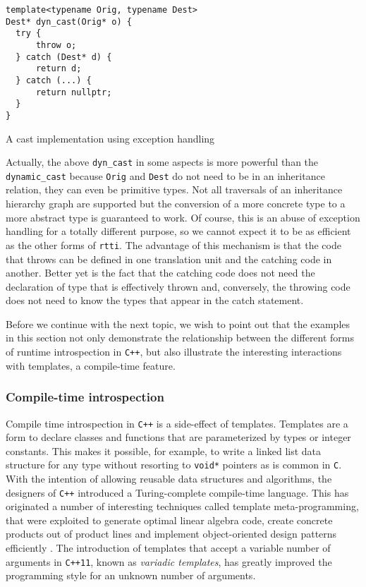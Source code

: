 \begin{listing}[H]
\begin{verbatim}
template<typename Orig, typename Dest>
Dest* dyn_cast(Orig* o) {
  try {
      throw o;
  } catch (Dest* d) {
      return d;
  } catch (...) {
      return nullptr;
  }
}
\end{verbatim}
\caption{A cast implementation using exception handling}
\label{lst:dyncast}
\end{listing}

Actually, the above \texttt{dyn\_cast} in some aspects is more powerful than the \texttt{dynamic\_cast} because \texttt{Orig} and
\texttt{Dest} do not need to be in an inheritance relation, they can even be primitive types. Not all traversals of an inheritance
hierarchy graph are supported but the conversion of a more concrete type to a more abstract type is guaranteed to work.
Of course, this is an abuse of exception handling for a totally different purpose, so we cannot expect it to be as efficient
as the other forms of \texttt{rtti}. The advantage of this mechanism is that the code that throws can be defined in one translation unit
and the catching code in another. Better yet is the fact that the catching code does not need the declaration of type that is effectively
thrown and, conversely, the throwing code does not need to know the types that appear in the catch statement. 

Before we continue with the next topic, we wish to point out that the examples in this section not only demonstrate the relationship
between the different forms of runtime introspection in \texttt{C++}, but also illustrate the interesting interactions with templates, a compile-time
feature.

\subsubsection{Compile-time introspection}

Compile time introspection in \texttt{C++} is a side-effect of templates. Templates are a form to declare classes and functions that are parameterized
by types or integer constants. This makes it possible, for example, to write a linked list data structure for any type without resorting
to \texttt{void*} pointers as is common in \texttt{C}. With the intention of allowing reusable data structures and algorithms, the designers
of \texttt{C++} introduced a Turing-complete compile-time language. This has originated a number of interesting techniques called template
meta-programming, that were exploited to generate optimal linear algebra code\cite{veldhuizen}, create concrete products out of product
lines\cite{Czarnecki98} and implement object-oriented design patterns efficiently \cite{Alexandrescu1}. The introduction of templates that accept
a variable number of arguments in \texttt{C++11}, known as \emph{variadic templates}, has greatly improved the programming style for an unknown number
of arguments.

